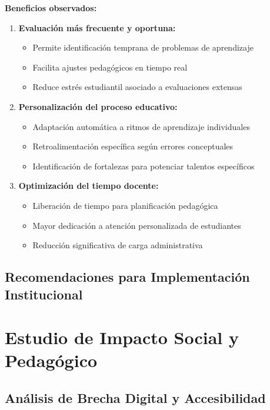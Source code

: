 \documentclass[12pt,a4paper]{report}
\begin{document}
\textbf{Beneficios observados:}
\begin{enumerate}
\item \textbf{Evaluación más frecuente y oportuna:}
   \begin{itemize}
   \item Permite identificación temprana de problemas de aprendizaje
   \item Facilita ajustes pedagógicos en tiempo real
   \item Reduce estrés estudiantil asociado a evaluaciones extensas
   \end{itemize}

\item \textbf{Personalización del proceso educativo:}
   \begin{itemize}
   \item Adaptación automática a ritmos de aprendizaje individuales
   \item Retroalimentación específica según errores conceptuales
   \item Identificación de fortalezas para potenciar talentos específicos
   \end{itemize}

\item \textbf{Optimización del tiempo docente:}
   \begin{itemize}
   \item Liberación de tiempo para planificación pedagógica
   \item Mayor dedicación a atención personalizada de estudiantes
   \item Reducción significativa de carga administrativa
   \end{itemize}
\end{enumerate}

\subsection{Recomendaciones para Implementación Institucional}

\section{Estudio de Impacto Social y Pedagógico}

\subsection{Análisis de Brecha Digital y Accesibilidad}
\end{document}
